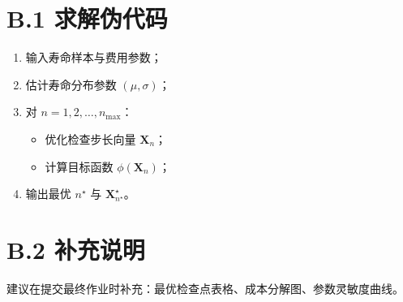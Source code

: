 \section*{B.1 求解伪代码}
\begin{enumerate}
  \item 输入寿命样本与费用参数；
  \item 估计寿命分布参数 $(\mu,\sigma)$；
  \item 对 $n=1,2,\ldots,n_{\max}$：
  \begin{itemize}
    \item 优化检查步长向量 $\mathbf X_n$；
    \item 计算目标函数 $\phi(\mathbf X_n)$；
  \end{itemize}
  \item 输出最优 $n^\star$ 与 $\mathbf X_{n^\star}^\star$。
\end{enumerate}

\section*{B.2 补充说明}
建议在提交最终作业时补充：最优检查点表格、成本分解图、参数灵敏度曲线。
